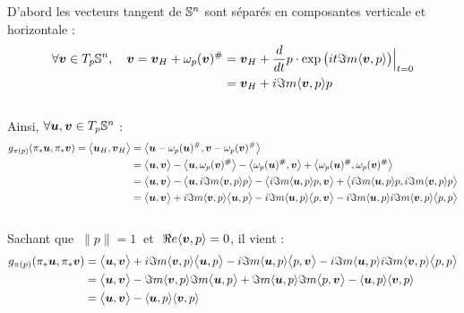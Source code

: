 D'abord les vecteurs tangent de $\S{n}$ sont séparés en composantes verticale et horizontale :
\begin{align}
	\forall \bf{v}\in \tg[p]{\S{n}},\quad \bf{v} = \bf{v}_H + \omega_p(\bf{v})^\# &= \bf{v}_H + \frac{d}{dt}p\cdot \exp\big(it\Im m \langle \bf{v}, p \rangle\big)\Big|_{t=0} \\
	&= \bf{v}_H  + i\Im m \langle \bf{v}, p \rangle p
\end{align}
\\
Ainsi, $\forall \bf{u},\bf{v}\in \tg[p]{\S{n}}$ :
\begin{align*}
	g_{\pi(p)}( \pi_*\bf{u}, \pi_*\bf{v}) = \big\langle \bf{u}_H, \bf{v}_H \big\rangle &= \big\langle\bf{u} - \conn_p(\bf{u})^\#, \bf{v} - \conn_p(\bf{v})^\# \big\rangle \\
	&= \big\langle\bf{u}, \bf{v} \big\rangle  - \big\langle\bf{u}, \conn_p(\bf{v})^\# \big\rangle - \big\langle \conn_p(\bf{u})^\#, \bf{v} \big\rangle + \big\langle \conn_p(\bf{u})^\#, \conn_p(\bf{v})^\# \big\rangle \\
	&= \big\langle\bf{u}, \bf{v} \big\rangle  - \big\langle\bf{u},  i\Im m \langle \bf{v}, p \rangle p \big\rangle - \big\langle  i\Im m \langle \bf{u}, p \rangle p, \bf{v} \big\rangle + \big\langle  i\Im m \langle \bf{u}, p \rangle p,  i\Im m \langle \bf{v}, p \rangle p \big\rangle \\
	&= \big\langle\bf{u}, \bf{v} \big\rangle  + i\Im m \langle \bf{v}, p \rangle\big\langle\bf{u}, p \big\rangle - i\Im m \langle \bf{u}, p \rangle\big\langle p, \bf{v} \big\rangle - i\Im m \langle \bf{u}, p \rangle i\Im m \langle \bf{v}, p \rangle \big\langle p, p \big\rangle
\end{align*}
\\
Sachant que $\ \|p\|=1\ $ et $\ \Re e \langle \bf{v},p\rangle = 0$, il vient :
\begin{align*}
	g_{\pi(p)}( \pi_*\bf{u}, \pi_*\bf{v}) 
	&= \big\langle\bf{u}, \bf{v} \big\rangle  + i\Im m \langle \bf{v}, p \rangle\big\langle\bf{u}, p \big\rangle - i\Im m \langle \bf{u}, p \rangle\big\langle p, \bf{v} \big\rangle - i\Im m \langle \bf{u}, p \rangle i\Im m \langle \bf{v}, p \rangle \big\langle p, p \big\rangle \\
	&= \big\langle\bf{u}, \bf{v} \big\rangle  -\Im m \langle \bf{v}, p \rangle \Im m\big\langle\bf{u}, p \big\rangle + \Im m \langle \bf{u}, p \rangle \Im m \big\langle p, \bf{v} \big\rangle - \langle \bf{u}, p \rangle \langle \bf{v}, p \rangle\\
	&= \big\langle\bf{u}, \bf{v} \big\rangle -  \langle \bf{u}, p \rangle \langle \bf{v}, p \rangle
\end{align*}

